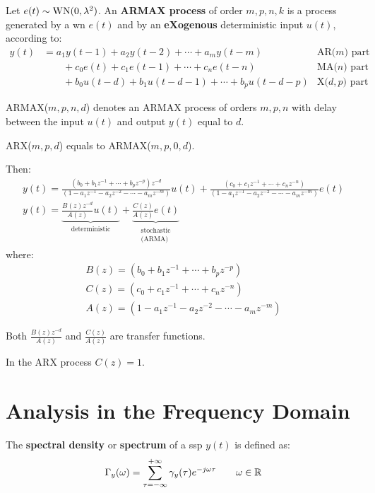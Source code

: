 \begin{definition}
	Let $e(t) \sim \operatorname{WN}(0, \lambda^{2})$. An \textbf{ARMAX process} of order $m,p,n,k$ is a process generated by a \gls{wn} $e(t)$ and by an \textbf{eXogenous} deterministic input $u(t)$, according to:
	\begin{equation*}
	   \boxed{
		   \begin{aligned}
				y(t)&=a_{1} y(t-1)+a_{2} y(t-2)+\cdots+a_{m} y(t-m) &\text{AR($m$) part}\\
				&\qquad+c_{0} e(t)+c_{1} e(t-1)+\cdots+c_{n} e(t-n) &\text{MA($n$) part} \\
				&\qquad+b_{0} u(t-d)+b_{1} u(t-d-1)+\cdots+b_{p} u(t-d-p)  &\text{X($d,p$) part}
			\end{aligned}
		}
	\end{equation*}
\end{definition}

ARMAX($m,p,n,d$) denotes an ARMAX process of orders $m,p,n$ with delay between the input $u(t)$ and output $y(t)$ equal to $d$.

ARX($m,p,d$) equals to ARMAX($m,p,0,d$).

Then:
\begin{gather*}
	y(t) = \frac{(b_{0}+b_{1} z^{-1}+\cdots+b_{p} z^{-p}) z^{-d}}{(1-a_{1} z^{-1}-a_{2} z^{-2}-\cdots-a_{m} z^{-m})} u(t)
	+ \frac{(c_{0}+c_{1} z^{-1}+\cdots+c_{n} z^{-n})}{(1-a_{1} z^{-1}-a_{2} z^{-2}-\cdots-a_{m} z^{-m})} e(t) \\
	\boxed{
		y(t) =
		\underbrace{\frac{B(z) z^{-d}}{A(z)} u(t)}_{\text{deterministic}}
		+\underbrace{\frac{C(z)}{A(z)} e(t)}_{\substack{\text{stochastic}\\ \text{(ARMA)}}}
	}
\end{gather*}
where:
\begin{gather*}
	\boxed{B(z) = \left(b_{0}+b_{1} z^{-1}+\cdots+b_{p} z^{-p}\right)}\\
	\boxed{C(z) = \left(c_{0}+c_{1} z^{-1}+\cdots+c_{n} z^{-n}\right)}\\
	\boxed{A(z) = \left(1-a_{1} z^{-1}-a_{2} z^{-2}-\cdots-a_{m} z^{-m}\right)}
\end{gather*}

Both $\frac{B(z) z^{-d}}{A(z)}$ and $\frac{C(z)}{A(z)}$ are transfer functions.

In the ARX process $C(z)=1$.

\chapter{Analysis in the Frequency Domain}
\begin{definition}
	The \textbf{spectral density} or \textbf{spectrum} of a \gls{ssp} $y(t)$ is defined as:
	\[
		\Gamma_{y}(\omega)=\sum_{\tau=-\infty}^{+\infty} \gamma_{y}(\tau) e^{-j \omega \tau} \qquad \omega \in \mathbb{R}
	\]
\end{definition}

